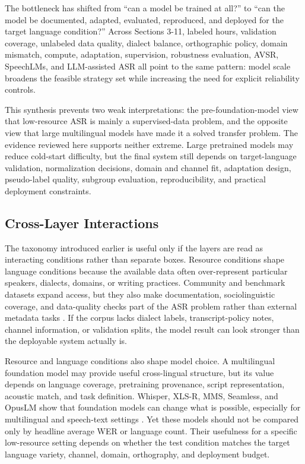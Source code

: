 \documentclass[pdflatex,sn-basic]{sn-jnl}
\theoremstyle{thmstyleone}
\theoremstyle{thmstyletwo}
\theoremstyle{thmstylethree}
\begin{document}
The bottleneck has shifted from ``can a model be trained at all?'' to ``can the model be documented, adapted, evaluated, reproduced, and deployed for the target language condition?'' Across Sections 3-11, labeled hours, validation coverage, unlabeled data quality, dialect balance, orthographic policy, domain mismatch, compute, adaptation, supervision, robustness evaluation, AVSR, SpeechLMs, and LLM-assisted ASR all point to the same pattern: model scale broadens the feasible strategy set while increasing the need for explicit reliability controls.

This synthesis prevents two weak interpretations: the pre-foundation-model view that low-resource ASR is mainly a supervised-data problem, and the opposite view that large multilingual models have made it a solved transfer problem. The evidence reviewed here supports neither extreme. Large pretrained models may reduce cold-start difficulty, but the final system still depends on target-language validation, normalization decisions, domain and channel fit, adaptation design, pseudo-label quality, subgroup evaluation, reproducibility, and practical deployment constraints.

\subsection{Cross-Layer Interactions}

The taxonomy introduced earlier is useful only if the layers are read as interacting conditions rather than separate boxes. Resource conditions shape language conditions because the available data often over-represent particular speakers, dialects, domains, or writing practices. Community and benchmark datasets expand access, but they also make documentation, sociolinguistic coverage, and data-quality checks part of the ASR problem rather than external metadata tasks \citep{ardila2020commonvoice,conneau2022fleurs,lau2025_data_quality_multilingual_speech}. If the corpus lacks dialect labels, transcript-policy notes, channel information, or validation splits, the model result can look stronger than the deployable system actually is.

Resource and language conditions also shape model choice. A multilingual foundation model may provide useful cross-lingual structure, but its value depends on language coverage, pretraining provenance, script representation, acoustic match, and task definition. Whisper, XLS-R, MMS, Seamless, and OpusLM show that foundation models can change what is possible, especially for multilingual and speech-text settings \citep{babu22_interspeech,pmlr-v202-radford23a,pratap2024mms,seamless2025_joint_speech_text_mt,tian25b_interspeech}. Yet these models should not be compared only by headline average WER or language count. Their usefulness for a specific low-resource setting depends on whether the test condition matches the target language variety, channel, domain, orthography, and deployment budget.
\end{document}
